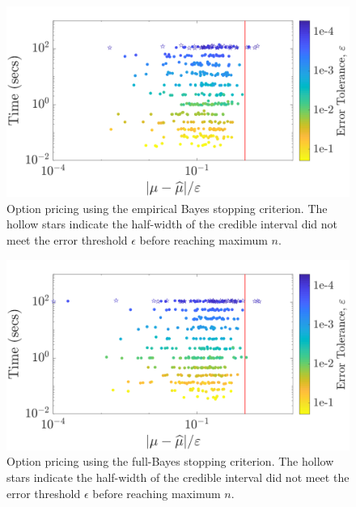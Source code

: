 \documentclass[graybox,footinfo]{svmult}
\newcommand{\JRNote}[1]{{\textcolor{green}{JR: #1}}}
\begin{document}
\begin{figure}
\centering
\includegraphics[width=0.95\linewidth]{"figures/Sobol/Sobol_optPrice_guaranteed_time_MLE__d12_r1_2019-Sep-1"}
\caption[Sobol: Option pricing guaranteed:EB]{Option pricing using the empirical Bayes stopping criterion. The hollow stars indicate the half-width of the credible interval did not meet the error threshold $\epsilon$ before reaching maximum $n$.}
\label{FJ:fig:Sobol-optprice-guaranteed-EB}
\end{figure}
\begin{figure}
\centering
\includegraphics[width=0.95\linewidth]{"figures/Sobol/Sobol_optPrice_guaranteed_time_full__d12_r1_2019-Sep-1"}
\caption[Sobol: Option pricing guaranteed: Full Bayes]{Option pricing using the full-Bayes stopping criterion. The hollow stars indicate the half-width of the credible interval did not meet the error threshold $\epsilon$ before reaching maximum $n$. 
}
\label{FJ:fig:Sobol-optprice-guaranteed-FB}
\end{figure}
\end{document}
